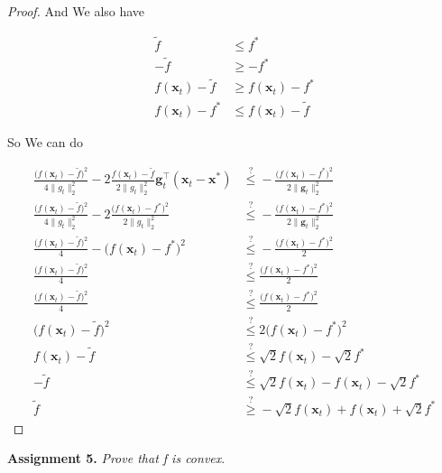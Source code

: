 \documentclass{article}
\begin{document}
\begin{proof}
	And We also have
	
	\begin{align}
		\tilde{f} &\le f^*\\		
		-\tilde{f} &\ge -f^*\\		
		f(\mathbf{x}_t) -\tilde{f} &\ge f(\mathbf{x}_t) -f^*\\	
		f(\mathbf{x}_t) -f^* &\le f(\mathbf{x}_t) -\tilde{f} 	
	\end{align}
	
	So We can do 
	
	\begin{align}
		\frac{\big(f(\mathbf{x}_t) - \tilde{f}\big)^2}{4\|g_t\|^2_2} - 2 \frac{f(\mathbf{x}_t) - \tilde{f}}{2\|g_t\|^2_2} \mathbf{g}_t^\top(\mathbf{x}_t-\mathbf{x}^*) &\stackrel{?}{\le} -\frac{\big(f(\mathbf{x}_t)-f^*\big)^2}{2\|\mathbf{g}_t\|^2_2}\\
		\frac{\big(f(\mathbf{x}_t) - \tilde{f}\big)^2}{4\|g_t\|^2_2} - 2 \frac{\big(f(\mathbf{x}_t) - f^*\big)^2}{2\|g_t\|^2_2} &\stackrel{?}{\le} -\frac{\big(f(\mathbf{x}_t)-f^*\big)^2}{2\|\mathbf{g}_t\|^2_2}\\
		\frac{\big(f(\mathbf{x}_t) - \tilde{f}\big)^2}{4} -  \big(f(\mathbf{x}_t) - f^*\big)^2 &\stackrel{?}{\le} -\frac{\big(f(\mathbf{x}_t)-f^*\big)^2}{2}\\
		\frac{\big(f(\mathbf{x}_t) - \tilde{f}\big)^2}{4}  &\stackrel{?}{\le} \frac{\big(f(\mathbf{x}_t)-f^*\big)^2}{2}\\
		\frac{\big(f(\mathbf{x}_t) - \tilde{f}\big)^2}{4}  &\stackrel{?}{\le} \frac{\big(f(\mathbf{x}_t)-f^*\big)^2}{2}\\
		\big(f(\mathbf{x}_t) - \tilde{f}\big)^2  &\stackrel{?}{\le} 2\big(f(\mathbf{x}_t)-f^*\big)^2\\
		f(\mathbf{x}_t) - \tilde{f}  &\stackrel{?}{\le} \sqrt{2}f(\mathbf{x}_t)-\sqrt{2}f^*\\
		- \tilde{f}  &\stackrel{?}{\le} \sqrt{2}f(\mathbf{x}_t) - f(\mathbf{x}_t) - \sqrt{2}f^* \\
		\tilde{f}  &\stackrel{?}{\ge} -\sqrt{2}f(\mathbf{x}_t) + f(\mathbf{x}_t) + \sqrt{2}f^* 
	\end{align}

\end{proof}


\textbf{Assignment 5.} \textit{Prove that f is convex}.
\end{document}
